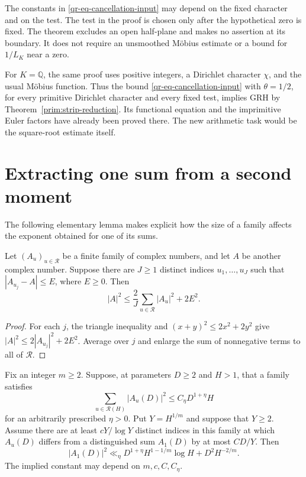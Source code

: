 \begin{remark}\label{qr-rem-mellin-quantifiers}
The constants in \eqref{qr-eq-cancellation-input} may depend on the
fixed character and on the test. The test in the proof is chosen only
after the hypothetical zero is fixed. The theorem excludes an open
half-plane and makes no assertion at its boundary. It does not require
an unsmoothed M\"obius estimate or a bound for $1/L_K$ near a zero.
\end{remark}

For $K=\mathbb Q$, the same proof uses positive integers, a Dirichlet
character $\chi$, and the usual M\"obius function. Thus the bound
\eqref{qr-eq-cancellation-input} with $\theta=1/2$, for every primitive
Dirichlet character and every fixed test, implies GRH by
Theorem~\ref{prim:strip-reduction}. Its functional equation and the
imprimitive Euler factors have already been proved there. The new
arithmetic task would be the square-root estimate itself.

\section{Extracting one sum from a second moment}
\label{qr-sec-moments}

The following elementary lemma makes explicit how the size of a family
affects the exponent obtained for one of its sums.

\begin{lemma}\label{qr-lem-replicated-rows}
Let $(A_u)_{u\in\mathcal R}$ be a finite family of complex numbers,
and let $A$ be another complex number. Suppose there are $J\geq1$
distinct indices $u_1,\ldots,u_J$ such that $|A_{u_j}-A|\leq E$,
where $E\geq0$. Then
\begin{equation}\label{qr-eq-replicated-rows}
 |A|^2\leq\frac2J\sum_{u\in\mathcal R}|A_u|^2+2E^2.
\end{equation}
\end{lemma}

\begin{proof}
For each $j$, the triangle inequality and $(x+y)^2\leq2x^2+2y^2$
give $|A|^2\leq2|A_{u_j}|^2+2E^2$. Average over $j$ and enlarge
the sum of nonnegative terms to all of $\mathcal R$.
\end{proof}

\begin{proposition}\label{qr-prop-power-rows}
Fix an integer $m\geq2$. Suppose, at parameters $D\geq2$ and $H>1$,
that a family satisfies
\[
 \sum_{u\in\mathcal R(H)}|A_u(D)|^2\leq C_\eta D^{1+\eta}H
\]
for an arbitrarily prescribed $\eta>0$. Put $Y=H^{1/m}$ and suppose
that $Y\geq2$. Assume there are at least $cY/\log Y$ distinct indices
in this family at which $A_u(D)$ differs from a distinguished sum
$A_1(D)$ by at most $C D/Y$. Then
\begin{equation}\label{qr-eq-power-extraction}
 |A_1(D)|^2\ll_\eta
 D^{1+\eta}H^{1-1/m}\log H+D^2H^{-2/m}.
\end{equation}
The implied constant may depend on $m,c,C,C_\eta$.
\end{proposition}

